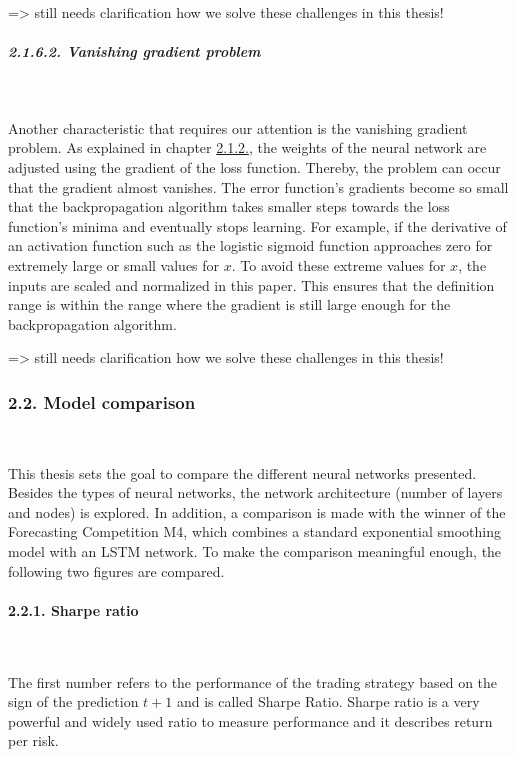 \documentclass[
]{article}
\begin{document}
=\textgreater{} still needs clarification how we solve these challenges
in this thesis!

\hypertarget{vanishing_gradient}{%
\subparagraph{2.1.6.2. Vanishing gradient
problem}\label{vanishing_gradient}}

~

Another characteristic that requires our attention is the vanishing
gradient problem. As explained in chapter
\protect\hyperlink{backpropagation_algorithm}{2.1.2.}, the weights of
the neural network are adjusted using the gradient of the loss function.
Thereby, the problem can occur that the gradient almost vanishes. The
error function's gradients become so small that the backpropagation
algorithm takes smaller steps towards the loss function's minima and
eventually stops learning. For example, if the derivative of an
activation function such as the logistic sigmoid function approaches
zero for extremely large or small values for \(x\). To avoid these
extreme values for \(x\), the inputs are scaled and normalized in this
paper. This ensures that the definition range is within the range where
the gradient is still large enough for the backpropagation algorithm.

=\textgreater{} still needs clarification how we solve these challenges
in this thesis!

\hypertarget{model_comparison}{%
\subsubsection{2.2. Model comparison}\label{model_comparison}}

~

This thesis sets the goal to compare the different neural networks
presented. Besides the types of neural networks, the network
architecture (number of layers and nodes) is explored. In addition, a
comparison is made with the winner of the Forecasting Competition M4,
which combines a standard exponential smoothing model with an LSTM
network. To make the comparison meaningful enough, the following two
figures are compared.

\hypertarget{sharpe_ratio}{%
\paragraph{2.2.1. Sharpe ratio}\label{sharpe_ratio}}

~

The first number refers to the performance of the trading strategy based
on the sign of the prediction \(t+1\) and is called Sharpe Ratio. Sharpe
ratio is a very powerful and widely used ratio to measure performance
and it describes return per risk.
\end{document}
